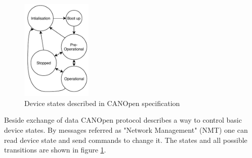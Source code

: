 \begin{figure}
    \begin{center}
       \includegraphics[width=0.3\textwidth]{figures/CANOpen_NMT}
    \end{center}
    \caption{Device states described in CANOpen specification}
    \label{fig:CANOpen NMT}
\end{figure}
Beside exchange of data CANOpen protocol describes a way to control basic device states. By messages referred as "Network Management" (NMT) one can read device state and send commands to change it. The states and all possible transitions are shown in figure \ref{fig:CANOpen NMT}.



